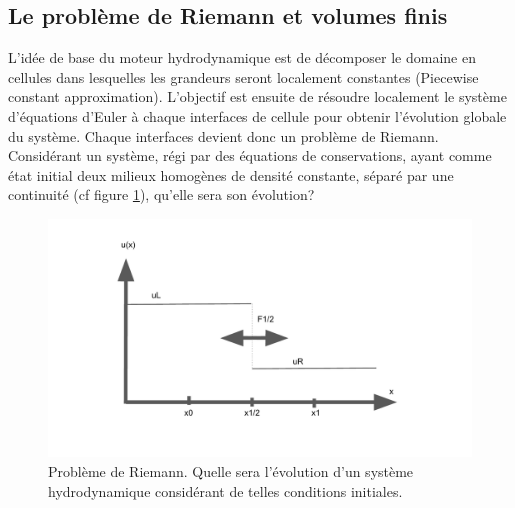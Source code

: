 \subsection{Le problème de Riemann et volumes finis}

L'idée de base du moteur hydrodynamique est de décomposer le domaine en cellules dans lesquelles les grandeurs seront localement constantes (Piecewise constant approximation).
L'objectif est ensuite de résoudre localement le système d'équations d'Euler à chaque interfaces de cellule pour obtenir l'évolution globale du système.
Chaque interfaces devient donc un problème de Riemann.
Considérant un système, régi par des équations de conservations, ayant comme état initial deux milieux homogènes de densité constante, séparé par une continuité (cf figure \ref{fig:riemann}), qu'elle sera son évolution?


\begin{figure}
        \includegraphics[width=.95\linewidth]{img/02/riemann.pdf} 
        \caption[Problème de Riemann]{Problème de Riemann. Quelle sera l'évolution d'un système hydrodynamique considérant de telles conditions initiales.  
 		\label{fig:riemann}
 		}
\end{figure}

